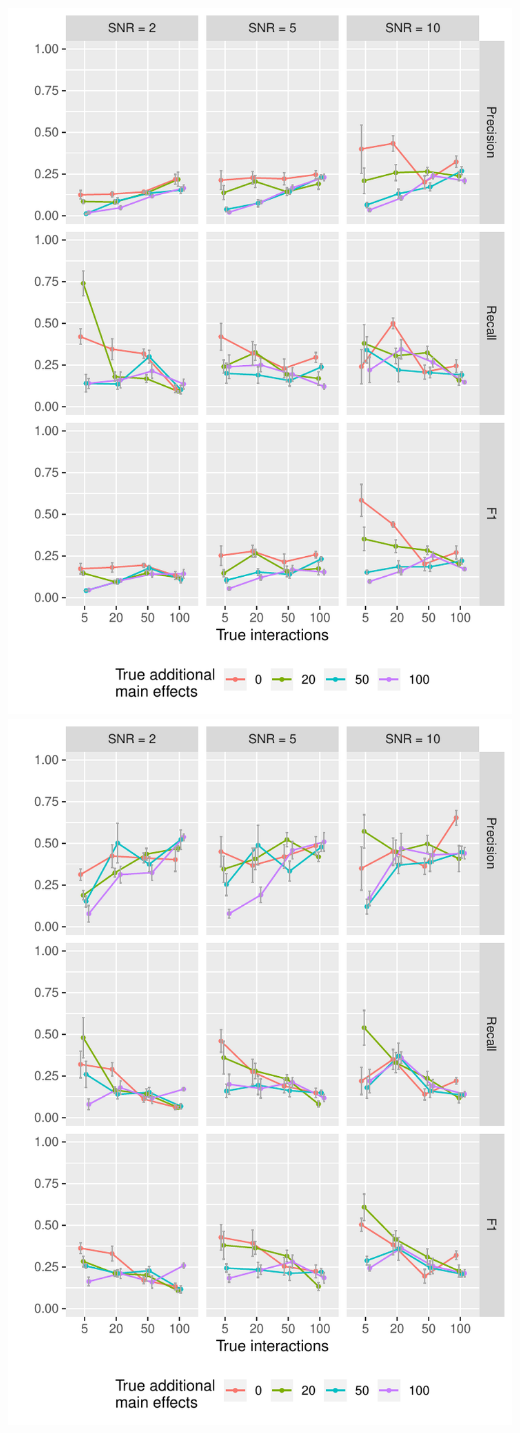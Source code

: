 \begin{minipage}{\linewidth}
	\centering
	\includegraphics[width=0.5\linewidth]{"output/PrecRecF1_n1000_tno_large0_"}%
	\includegraphics[width=0.5\linewidth]{"output/PrecRecF1_n1000_tyes_large0_"}
\end{minipage}
